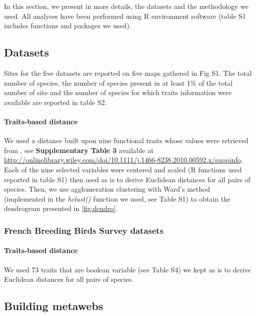 In this section, we present in more details, the datasets and the
methodology we used. All analyses have been performed using R
environment software (table S1 includes functions and packages we used).

\subsection{Datasets}\label{datasets}

Sites for the five datasets are reported on five maps gathered in Fig
S1. The total number of species, the number of species present in at
least 1\% of the total number of site and the number of species for
which traits information were available are reported in table S2.

\paragraph{Traits-based distance}\label{traits-based-distance}

We used a distance built upon nine functional traits whose values were
retrieved from \citep{Paquette2011}, see \textbf{Supplementary Table 3}
available at
\url{http://onlinelibrary.wiley.com/doi/10.1111/j.1466-8238.2010.00592.x/suppinfo}.
Each of the nine selected variables were centered and scaled (R
functions used reported in table S1) then used as is to derive Euclidean
distances for all pairs of species. Then, we use agglomeration
clustering with Ward's method (implemented in the \emph{hclust()}
function we used, see Table S1) to obtain the dendrogram presented in
\ref{fig:dendro}.

\subsubsection{French Breeding Birds Survey
datasets}\label{french-breeding-birds-survey-datasets}

\paragraph{Traits-based distance}\label{traits-based-distance-1}

We used 73 traits that are boolean variable (see Table S4) we kept as is
to derive Euclidean distances for all pairs of species.

\subsection{Building metawebs}\label{building-metawebs}

